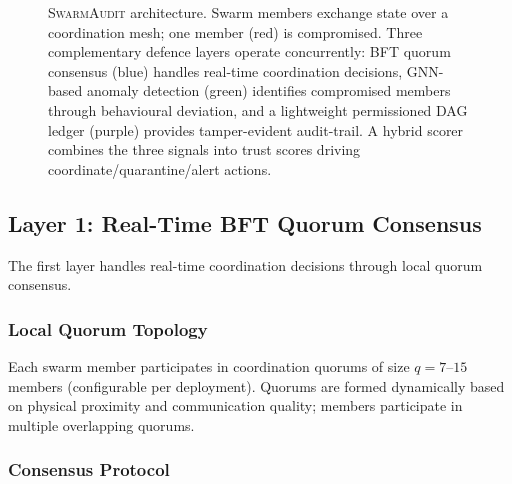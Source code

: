 \documentclass[sigconf,nonacm]{acmart}
\begin{document}
\begin{figure}[t]
\caption{\textsc{SwarmAudit} architecture. Swarm members exchange
  state over a coordination mesh; one member (red) is compromised.
  Three complementary defence layers operate concurrently: BFT
  quorum consensus (blue) handles real-time coordination decisions,
  GNN-based anomaly detection (green) identifies compromised
  members through behavioural deviation, and a lightweight
  permissioned DAG ledger (purple) provides tamper-evident
  audit-trail. A hybrid scorer combines the three signals into
  trust scores driving coordinate/quarantine/alert actions.}
\label{fig:framework}
\end{figure}

\subsection{Layer 1: Real-Time BFT Quorum Consensus}

The first layer handles real-time coordination decisions through
local quorum consensus.

\subsubsection{Local Quorum Topology}

Each swarm member participates in coordination quorums of size
$q = 7$--$15$ members (configurable per deployment). Quorums are
formed dynamically based on physical proximity and communication
quality; members participate in multiple overlapping quorums.

\subsubsection{Consensus Protocol}
\end{document}
